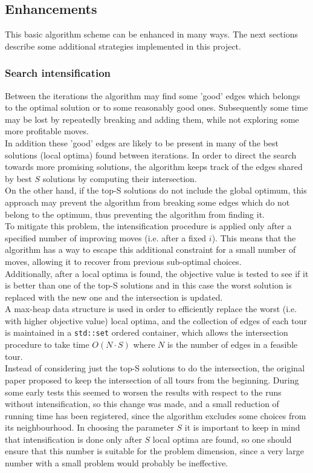 \subsection{Enhancements}
This basic algorithm scheme can be enhanced in many ways. The next sections describe some additional strategies implemented in this project.

\subsubsection{Search intensification}
\label{sssec:intensification}
Between the iterations the algorithm may find some 'good' edges which belongs to the optimal solution or to some reasonably good ones. Subsequently some time may be lost by repeatedly breaking and adding them, while not exploring some more profitable moves. \\
In addition these 'good' edges are likely to be present in many of the best solutions (local optima) found between iterations. In order to direct the search towards more promising solutions, the algorithm keeps track of the edges shared by best $S$ solutions by computing their intersection.\\ 
On the other hand, if the top-S solutions do not include the global optimum, this approach  may prevent the algorithm from breaking some edges which do not belong to the optimum, thus preventing the algorithm from finding it.\\ To mitigate this problem, the intensification procedure is applied only after a specified number of improving moves (i.e. after a fixed $i$). This means that the algorithm has a way to escape this additional constraint for a small number of moves, allowing it to recover from previous sub-optimal choices.\\ 
Additionally, after a local optima is found, the objective value is tested to see if it is better than one of the top-S solutions and in this case the worst solution is replaced with the new one and the intersection is updated.\\
A max-heap data structure is used in order to efficiently replace the worst (i.e. with higher objective value) local optima, and the collection of edges of each tour is maintained in a \texttt{std::set} ordered container, which allows the intersection procedure to take time $O(N\cdot S)$ where $N$ is the number of edges in a feasible tour.\\
Instead of considering just the top-S solutions to do the intersection, the original paper proposed to keep the intersection of all tours from the beginning. During some early tests this seemed to worsen the results with respect to the runs without intensification, so this change was made, and a small reduction of running time has been registered, since the algorithm excludes some choices from its neighbourhood.
In choosing the parameter $S$ it is important to keep in mind that intensification is done only after $S$ local optima are found, so one should ensure that this number is suitable for the problem dimension, since a very large number with a small problem would probably be ineffective.

